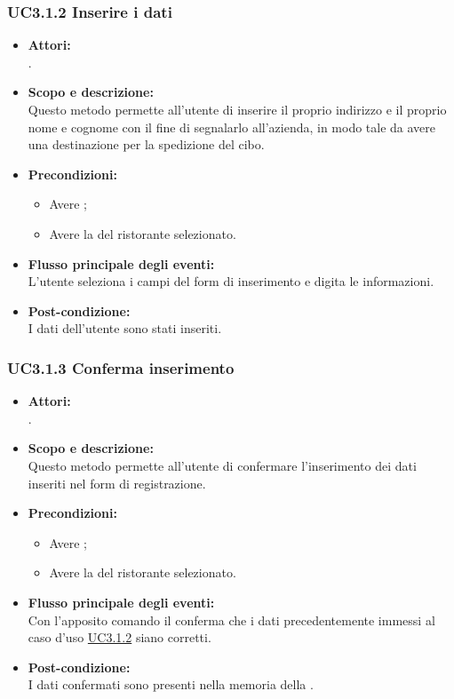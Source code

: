 \subsubsection{UC3.1.2 Inserire i dati} \label{UC3.1.2}

\begin{itemize}
	\item \textbf{Attori:}
	\\.
	\item \textbf{Scopo e descrizione:} 
	\\Questo metodo permette all'utente di inserire il proprio indirizzo e il proprio nome e cognome con il fine di segnalarlo all'azienda, in modo tale da avere una destinazione per la spedizione del cibo.
	\item \textbf{Precondizioni:}
	\begin{itemize}
		\item Avere ;
		\item Avere la  del ristorante selezionato.
	\end{itemize}
	\item \textbf{Flusso principale degli eventi:}
	\\L'utente seleziona i campi del form di inserimento e digita le informazioni.
	\item \textbf{Post-condizione:}
	\\I dati dell'utente sono stati inseriti.
\end{itemize}

\subsubsection{UC3.1.3 Conferma inserimento} \label{UC3.1.3}

\begin{itemize}
	\item \textbf{Attori:}
	\\.
	\item \textbf{Scopo e descrizione:} 
	\\Questo metodo permette all'utente di confermare l'inserimento dei dati inseriti nel form di registrazione.
	\item \textbf{Precondizioni:}
	\begin{itemize}
		\item Avere ;
		\item Avere la  del ristorante selezionato.
	\end{itemize}
	\item \textbf{Flusso principale degli eventi:}
	\\Con l'apposito comando il  conferma che i dati precedentemente immessi al caso d'uso \hyperref[UC3.1.2]{UC3.1.2} siano corretti.
	\item \textbf{Post-condizione:}
	\\I dati confermati sono presenti nella memoria della .
\end{itemize}

